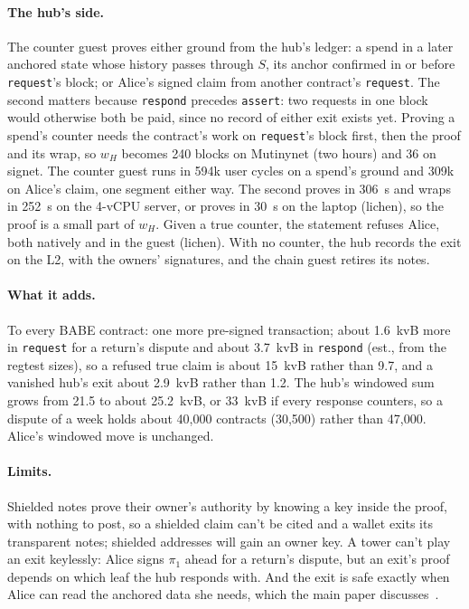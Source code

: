\documentclass[11pt]{article}
\newcommand{\tx}[1]{\texttt{#1}}
\begin{document}
\paragraph{The hub's side.} The counter guest proves either ground
from the hub's ledger: a spend in a later anchored state whose history
passes through $S$, its anchor confirmed in or before \tx{request}'s
block; or Alice's signed claim from another contract's \tx{request}.
The second matters because \tx{respond} precedes \tx{assert}: two
requests in one block would otherwise both be paid, since no record of
either exit exists yet. Proving a spend's counter needs the contract's
work on \tx{request}'s block first, then the proof and its wrap, so
$w_H$ becomes 240 blocks on Mutinynet (two hours) and 36 on signet. The
counter guest runs in 594k user cycles on a spend's ground and 309k on
Alice's claim, one segment either way. The second proves in 306~s and
wraps in 252~s on the 4-vCPU server, or proves in 30~s on the laptop
(lichen), so the proof is a small part of $w_H$. Given a true counter, the
statement refuses Alice, both natively and in the guest (lichen). With
no counter, the hub records the exit on the L2, with the owners'
signatures, and the chain guest retires its notes.

\paragraph{What it adds.} To every BABE contract: one more pre-signed
transaction; about 1.6~kvB more in \tx{request} for a return's dispute
and about 3.7~kvB in \tx{respond} (est., from the regtest sizes), so a
refused true claim is about 15~kvB rather than 9.7, and a vanished hub's
exit about 2.9~kvB rather than 1.2. The hub's windowed sum grows from
21.5 to about 25.2~kvB, or 33~kvB if every response counters, so a
dispute of a week holds about 40,000 contracts (30,500) rather than
47,000. Alice's windowed move is unchanged.

\paragraph{Limits.} Shielded notes prove their owner's authority by
knowing a key inside the proof, with nothing to post, so a shielded claim
can't be cited and a wallet exits its transparent notes; shielded
addresses will gain an owner key. A tower can't play an exit keylessly:
Alice signs $\pi_1$ ahead for a return's dispute, but an exit's proof
depends on which leaf the hub responds with. And the exit is safe
exactly when Alice can read the anchored data she needs, which the main
paper discusses~\cite{lichen}.
\end{document}
